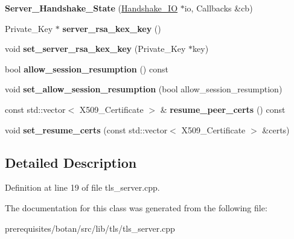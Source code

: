 \begin{DoxyCompactItemize}
\item 
\mbox{\label{class_botan_1_1_t_l_s_1_1_server___handshake___state_a449e7566a2c05b4734636ceab88c3ed4}} 
{\bfseries Server\+\_\+\+Handshake\+\_\+\+State} (\mbox{\hyperlink{class_botan_1_1_t_l_s_1_1_handshake___i_o}{Handshake\+\_\+\+IO}} $\ast$io, Callbacks \&cb)
\item 
\mbox{\label{class_botan_1_1_t_l_s_1_1_server___handshake___state_acc0175d4f9a427ebb745e3427ab0f81e}} 
Private\+\_\+\+Key $\ast$ {\bfseries server\+\_\+rsa\+\_\+kex\+\_\+key} ()
\item 
\mbox{\label{class_botan_1_1_t_l_s_1_1_server___handshake___state_a39584c03a6b9d7d90c76a8669464b4c6}} 
void {\bfseries set\+\_\+server\+\_\+rsa\+\_\+kex\+\_\+key} (Private\+\_\+\+Key $\ast$key)
\item 
\mbox{\label{class_botan_1_1_t_l_s_1_1_server___handshake___state_a3848cc3b9085719a245c40a3d1f69f14}} 
bool {\bfseries allow\+\_\+session\+\_\+resumption} () const
\item 
\mbox{\label{class_botan_1_1_t_l_s_1_1_server___handshake___state_ad7b5e06aafebe241a706566b5a36e5b4}} 
void {\bfseries set\+\_\+allow\+\_\+session\+\_\+resumption} (bool allow\+\_\+session\+\_\+resumption)
\item 
\mbox{\label{class_botan_1_1_t_l_s_1_1_server___handshake___state_a105a2f1872329231d2b0f49d72400603}} 
const std\+::vector$<$ X509\+\_\+\+Certificate $>$ \& {\bfseries resume\+\_\+peer\+\_\+certs} () const
\item 
\mbox{\label{class_botan_1_1_t_l_s_1_1_server___handshake___state_a58c4e9e88bc18e669011edefc26816bd}} 
void {\bfseries set\+\_\+resume\+\_\+certs} (const std\+::vector$<$ X509\+\_\+\+Certificate $>$ \&certs)
\end{DoxyCompactItemize}


\subsection{Detailed Description}


Definition at line 19 of file tls\+\_\+server.\+cpp.



The documentation for this class was generated from the following file\+:\begin{DoxyCompactItemize}
\item 
prerequisites/botan/src/lib/tls/tls\+\_\+server.\+cpp\end{DoxyCompactItemize}
